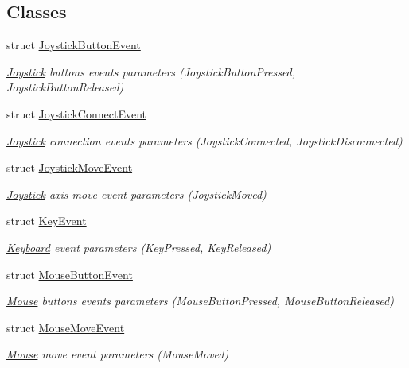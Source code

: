 \subsection*{Classes}
\begin{DoxyCompactItemize}
\item 
struct \hyperlink{structsf_1_1_event_1_1_joystick_button_event}{Joystick\-Button\-Event}
\begin{DoxyCompactList}\small\item\em \hyperlink{classsf_1_1_joystick}{Joystick} buttons events parameters (Joystick\-Button\-Pressed, Joystick\-Button\-Released) \end{DoxyCompactList}\item 
struct \hyperlink{structsf_1_1_event_1_1_joystick_connect_event}{Joystick\-Connect\-Event}
\begin{DoxyCompactList}\small\item\em \hyperlink{classsf_1_1_joystick}{Joystick} connection events parameters (Joystick\-Connected, Joystick\-Disconnected) \end{DoxyCompactList}\item 
struct \hyperlink{structsf_1_1_event_1_1_joystick_move_event}{Joystick\-Move\-Event}
\begin{DoxyCompactList}\small\item\em \hyperlink{classsf_1_1_joystick}{Joystick} axis move event parameters (Joystick\-Moved) \end{DoxyCompactList}\item 
struct \hyperlink{structsf_1_1_event_1_1_key_event}{Key\-Event}
\begin{DoxyCompactList}\small\item\em \hyperlink{classsf_1_1_keyboard}{Keyboard} event parameters (Key\-Pressed, Key\-Released) \end{DoxyCompactList}\item 
struct \hyperlink{structsf_1_1_event_1_1_mouse_button_event}{Mouse\-Button\-Event}
\begin{DoxyCompactList}\small\item\em \hyperlink{classsf_1_1_mouse}{Mouse} buttons events parameters (Mouse\-Button\-Pressed, Mouse\-Button\-Released) \end{DoxyCompactList}\item 
struct \hyperlink{structsf_1_1_event_1_1_mouse_move_event}{Mouse\-Move\-Event}
\begin{DoxyCompactList}\small\item\em \hyperlink{classsf_1_1_mouse}{Mouse} move event parameters (Mouse\-Moved) \end{DoxyCompactList}\item 

\end{DoxyCompactItemize}
